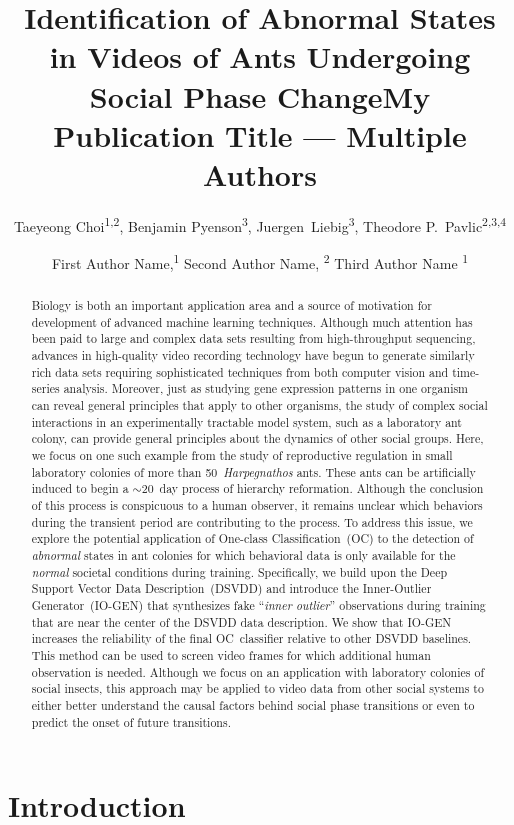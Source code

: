 \documentclass[letterpaper]{article} %
\title{Identification of Abnormal States in Videos of Ants Undergoing Social Phase Change}
\author{
Taeyeong Choi\textsuperscript{\rm 1,2},
Benjamin Pyenson\textsuperscript{\rm 3},
Juergen~Liebig\textsuperscript{\rm 3},
Theodore P.~Pavlic\textsuperscript{\rm 2,3,4} \\
}
\title{My Publication Title --- Multiple Authors}
\author {

First Author Name,\textsuperscript{\rm 1}
Second Author Name, \textsuperscript{\rm 2}
Third Author Name \textsuperscript{\rm 1} \\
}
\begin{document}
\maketitle

\begin{abstract}
Biology is both an important application area and a source of motivation
for development of advanced machine learning techniques. Although
much attention has been paid to large and complex data sets
resulting from high-throughput sequencing, advances in
high-quality video recording technology have begun to generate
similarly rich data sets requiring sophisticated techniques from both
computer vision and time-series analysis. Moreover, just as studying
gene expression patterns in one organism can reveal general principles
that apply to other organisms, the study of complex social
interactions in an experimentally tractable model system, such as a
laboratory ant colony, can provide general principles about the dynamics
of other social groups. Here, we focus on one such example
from the study of reproductive regulation in small laboratory colonies
of more than 50~\emph{Harpegnathos} ants. These ants can be
artificially induced to begin a $\sim$20~day process of hierarchy
reformation. Although the conclusion of this process is conspicuous to a
human observer, it remains unclear which behaviors during the
transient period are contributing to the process. To address this issue, we
explore the potential application of One-class Classification~(OC) to
the detection of \emph{abnormal} states in ant colonies for which
behavioral data is only available for the \emph{normal} societal
conditions during training. Specifically, we build upon the Deep Support
Vector Data Description~(DSVDD) and introduce the Inner-Outlier
Generator~(\mbox{IO-GEN}) that synthesizes fake ``\emph{inner outlier}''
observations during training that are near the center of the DSVDD data
description. We show that \mbox{IO-GEN} increases the reliability of the final
OC~classifier relative to other DSVDD baselines. This method can be used
to screen video frames for which additional human observation is needed.
Although we focus on an application with laboratory colonies of social
insects, this approach may be applied to video data from other social
systems to either better understand the causal factors behind social
phase transitions or even to predict the onset of future transitions.
\end{abstract}

\section{Introduction}
\label{sec:intro}
\end{document}
